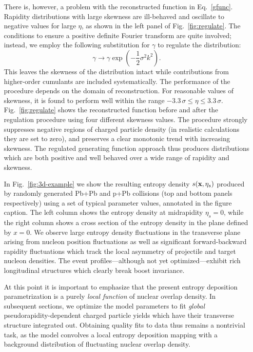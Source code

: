 There is, however, a problem with the reconstructed function in Eq.~\eqref{gfunc}.
Rapidity distributions with large skewness are ill-behaved and oscillate to negative values for large $\eta$, as shown in the left panel of Fig.~\ref{fig:regulate}.
The conditions to ensure a positive definite Fourier transform are quite involved; instead, we employ the following substitution for $\gamma$ to regulate the distribution:
\begin{equation}
  \gamma \rightarrow \gamma \exp \left({-}\frac{1}{2}\sigma^2k^2 \right). \label{regulateEq}
\end{equation}
This leaves the skewness of the distribution intact while contributions from higher-order cumulants are included systematically.
The performance of the procedure depends on the domain of reconstruction.
For reasonable values of skewness, it is found to perform well within the range ${-3.3\, \sigma \le \eta \le 3.3\, \sigma}$.
Fig.~\ref{fig:regulate} shows the reconstructed function before and after the regulation procedure using four different skewness values.
The procedure strongly suppresses negative regions of charged particle density (in realistic calculations they are set to zero), and preserves a clear monotonic trend with increasing skewness.
The regulated generating function approach thus produces distributions which are both positive and well behaved over a wide range of rapidity and skewness.

In Fig.~\ref{fig:3d-example} we show the resulting entropy density $s(\mathbf x, \eta_s)$ produced by randomly generated Pb+Pb and p+Pb collisions (top and bottom panels respectively) using a set of typical parameter values, annotated in the figure caption.
The left column shows the entropy density at midrapidity $\eta_s=0$, while the right column shows a cross section of the entropy density in the plane defined by $x=0$.
We observe large entropy density fluctuations in the transverse plane arising from nucleon position fluctuations as well as significant forward-backward rapidity fluctuations which track the local asymmetry of projectile and target nucleon densities.
The event profiles---although not yet optimized---exhibit rich longitudinal structures which clearly break boost invariance.

At this point it is important to emphasize that the present entropy deposition parametrization is a purely \emph{local function} of nuclear overlap density.
In subsequent sections, we optimize the model parameters to fit \emph{global} pseudorapidity-dependent charged particle yields which have their transverse structure integrated out.
Obtaining quality fits to data thus remains a nontrivial task, as the model convolves a local entropy deposition mapping with a background distribution of fluctuating nuclear overlap density.


